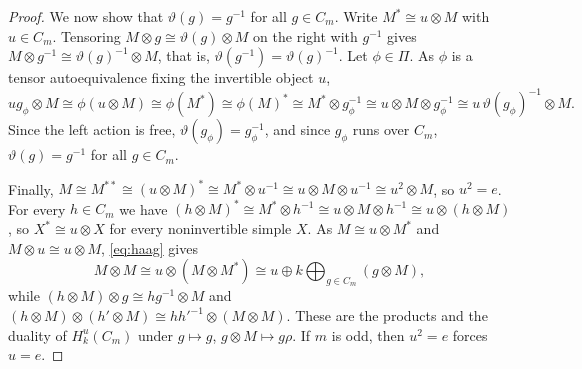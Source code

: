 \documentclass[10pt]{article}
\theoremstyle{plain}
\theoremstyle{definition}
\theoremstyle{plain}
\begin{document}
\begin{proof}
We now show that $\vartheta(g)=g^{-1}$ for all $g\in C_m$. Write $M^\ast\cong u\otimes M$ with $u\in C_m$. Tensoring $M\otimes g\cong\vartheta(g)\otimes M$ on the right with $g^{-1}$ gives $M\otimes g^{-1}\cong\vartheta(g)^{-1}\otimes M$, that is, $\vartheta(g^{-1})=\vartheta(g)^{-1}$. Let $\phi\in\Pi$. As $\phi$ is a tensor autoequivalence fixing the invertible object $u$,
\[
  ug_\phi\otimes M\cong\phi(u\otimes M)\cong\phi(M^\ast)\cong\phi(M)^\ast\cong M^\ast\otimes g_\phi^{-1}\cong u\otimes M\otimes g_\phi^{-1}\cong u\,\vartheta(g_\phi)^{-1}\otimes M .
\]
Since the left action is free, $\vartheta(g_\phi)=g_\phi^{-1}$, and since $g_\phi$ runs over $C_m$, $\vartheta(g)=g^{-1}$ for all $g\in C_m$.

Finally, $M\cong M^{\ast\ast}\cong(u\otimes M)^\ast\cong M^\ast\otimes u^{-1}\cong u\otimes M\otimes u^{-1}\cong u^2\otimes M$, so $u^2=e$. For every $h\in C_m$ we have $(h\otimes M)^\ast\cong M^\ast\otimes h^{-1}\cong u\otimes M\otimes h^{-1}\cong u\otimes(h\otimes M)$, so $X^\ast\cong u\otimes X$ for every noninvertible simple $X$. As $M\cong u\otimes M^\ast$ and $M\otimes u\cong u\otimes M$, \eqref{eq:haag} gives
\[
  M\otimes M\cong u\otimes(M\otimes M^\ast)\cong u\oplus k\!\!\bigoplus_{g\in C_m}\!\!(g\otimes M),
\]
while $(h\otimes M)\otimes g\cong hg^{-1}\otimes M$ and $(h\otimes M)\otimes(h'\otimes M)\cong hh'^{-1}\otimes(M\otimes M)$. These are the products and the duality of $H_k^u(C_m)$ under $g\mapsto g$, $g\otimes M\mapsto g\rho$. If $m$ is odd, then $u^2=e$ forces $u=e$.


\end{proof}
\end{document}
